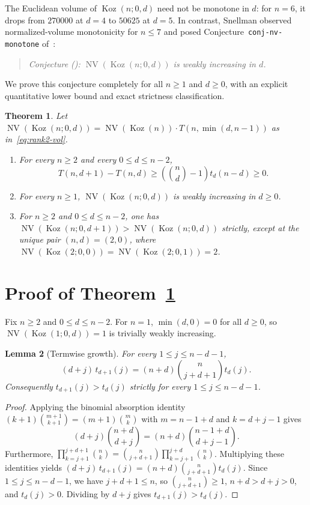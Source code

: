 \documentclass[11pt]{article}
\newtheorem{theorem}{Theorem}[section]
\newtheorem{lemma}[theorem]{Lemma}
\theoremstyle{remark}
\DeclareMathOperator{\NV}{NV}
\DeclareMathOperator{\Koz}{Koz}
\begin{document}
The Euclidean volume of $\Koz(n; 0, d)$ need not be monotone in $d$: for $n = 6$, it drops from $270000$ at $d = 4$ to $50625$ at $d = 5$. In contrast, Snellman observed normalized-volume monotonicity for $n \le 7$ and posed Conjecture~\texttt{conj-nv-monotone} of~\cite{Snellman2026}:

\begin{quote}
\emph{Conjecture (\cite{Snellman2026}): $\NV(\Koz(n; 0, d))$ is weakly increasing in $d$.}
\end{quote}

We prove this conjecture completely for all $n \ge 1$ and $d \ge 0$, with an explicit quantitative lower bound and exact strictness classification.

\begin{theorem}\label{thm:main}
Let $\NV(\Koz(n; 0, d)) = \NV(\Koz(n)) \cdot T(n, \min(d, n - 1))$ as in~\eqref{eq:rank2-vol}.
\begin{enumerate}
  \item For every $n \ge 2$ and every $0 \le d \le n - 2$,
  \[
    T(n, d + 1) - T(n, d) \ge \left(\binom{n}{d} - 1\right) t_d(n - d) \ge 0.
  \]
  \item For every $n \ge 1$, $\NV(\Koz(n; 0, d))$ is weakly increasing in $d \ge 0$.
  \item For $n \ge 2$ and $0 \le d \le n - 2$, one has $\NV(\Koz(n; 0, d + 1)) > \NV(\Koz(n; 0, d))$ strictly, except at the unique pair $(n, d) = (2, 0)$, where $\NV(\Koz(2; 0, 0)) = \NV(\Koz(2; 0, 1)) = 2$.
\end{enumerate}
\end{theorem}

\section{Proof of Theorem~\ref{thm:main}}

Fix $n \ge 2$ and $0 \le d \le n - 2$. For $n = 1$, $\min(d, 0) = 0$ for all $d \ge 0$, so $\NV(\Koz(1; 0, d)) = 1$ is trivially weakly increasing.

\begin{lemma}[Termwise growth]\label{lem:ratio}
For every $1 \le j \le n - d - 1$,
\[
  (d + j)\, t_{d+1}(j) = (n + d) \binom{n}{j + d + 1} t_d(j).
\]
Consequently $t_{d+1}(j) > t_d(j)$ strictly for every $1 \le j \le n - d - 1$.
\end{lemma}

\begin{proof}
Applying the binomial absorption identity $(k+1)\binom{m+1}{k+1} = (m+1)\binom{m}{k}$ with $m = n - 1 + d$ and $k = d + j - 1$ gives
\[
  (d + j)\binom{n + d}{d + j} = (n + d)\binom{n - 1 + d}{d + j - 1}.
\]
Furthermore, $\prod_{k=j+1}^{j+d+1}\binom{n}{k} = \binom{n}{j + d + 1} \prod_{k=j+1}^{j+d}\binom{n}{k}$. Multiplying these identities yields $(d + j)\, t_{d+1}(j) = (n + d)\binom{n}{j + d + 1} t_d(j)$. Since $1 \le j \le n - d - 1$, we have $j + d + 1 \le n$, so $\binom{n}{j + d + 1} \ge 1$, $n + d > d + j > 0$, and $t_d(j) > 0$. Dividing by $d + j$ gives $t_{d+1}(j) > t_d(j)$.
\end{proof}
\end{document}
